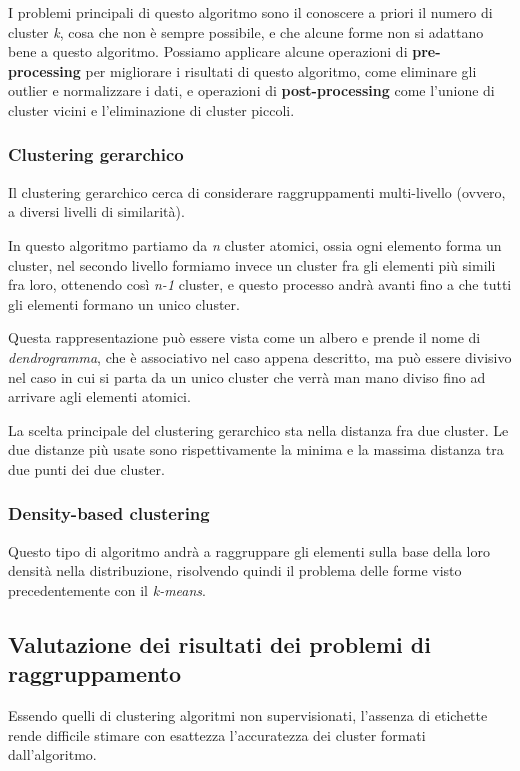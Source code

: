             I problemi principali di questo algoritmo sono il conoscere a priori il numero di cluster \textit{k}, cosa che non è sempre possibile, e che alcune forme non si adattano bene a questo algoritmo. Possiamo applicare alcune operazioni di \textbf{pre-processing} per migliorare i risultati di questo algoritmo, come eliminare gli outlier e normalizzare i dati, e operazioni di \textbf{post-processing} come l'unione di cluster vicini e l'eliminazione di cluster piccoli.
            
        \subsubsection{Clustering gerarchico}
            Il clustering gerarchico cerca di considerare raggruppamenti multi-livello (ovvero, a diversi livelli di similarità).
            
            In questo algoritmo partiamo da \textit{n} cluster atomici, ossia ogni elemento forma un cluster, nel secondo livello formiamo invece un cluster fra gli elementi più simili fra loro, ottenendo così \textit{n-1} cluster, e questo processo andrà avanti fino a che tutti gli elementi formano un unico cluster.
            
            Questa rappresentazione può essere vista come un albero e prende il nome di \textit{dendrogramma}, che è associativo nel caso appena descritto, ma può essere divisivo nel caso in cui si parta da un unico cluster che verrà man mano diviso fino ad arrivare agli elementi atomici.
            
            La scelta principale del clustering gerarchico sta nella distanza fra due cluster. Le due distanze più usate sono rispettivamente la minima e la massima distanza tra due punti dei due cluster.
            
        \subsubsection{Density-based clustering}
            Questo tipo di algoritmo andrà a raggruppare gli elementi sulla base della loro densità nella distribuzione, risolvendo quindi il problema delle forme visto precedentemente con il \textit{k-means}.
            
    \subsection{Valutazione dei risultati dei problemi di raggruppamento}
        Essendo quelli di clustering algoritmi non supervisionati, l'assenza di etichette rende difficile stimare con esattezza l'accuratezza dei cluster formati dall'algoritmo.
        
